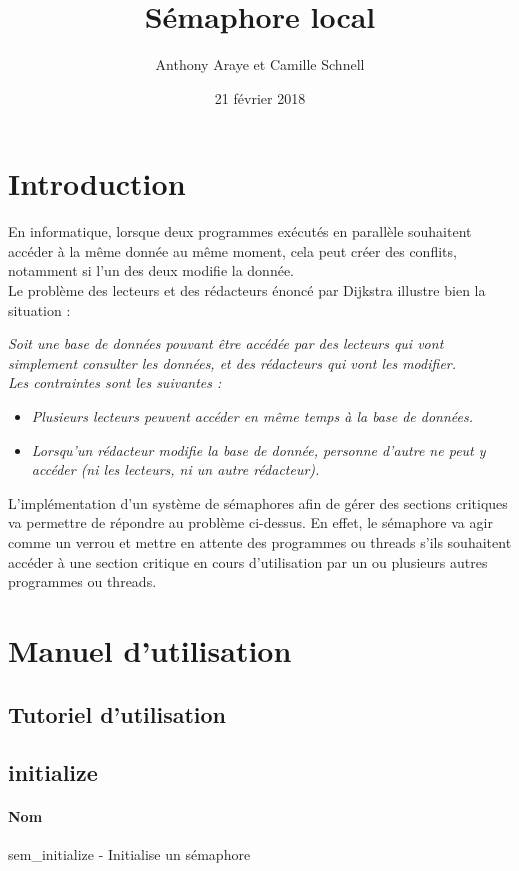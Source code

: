 \documentclass[12pt]{article}
\title{Sémaphore local}
\author{Anthony Araye et Camille Schnell}
\date{21 février 2018}
\begin{document}
\maketitle
\renewcommand{\contentsname}{Sommaire}
\tableofcontents
\newpage
\section{Introduction}
    En informatique, lorsque deux programmes exécutés en parallèle souhaitent accéder à la même donnée au même moment, cela peut créer des conflits, notamment si l'un des deux modifie la donnée. \\

    Le problème des lecteurs et des rédacteurs énoncé par Dijkstra illustre bien la situation :

    \textit{Soit une base de données pouvant être accédée par des lecteurs qui vont simplement consulter les données, et des rédacteurs qui vont les modifier. \\
    Les contraintes sont les suivantes :}
    \begin{itemize}
      \item \textit{Plusieurs lecteurs peuvent accéder en même temps à la base de données.}
      \item \textit{Lorsqu'un rédacteur modifie la base de donnée, personne d'autre ne peut y accéder (ni les lecteurs, ni un autre rédacteur).} \\
    \end{itemize}

    L'implémentation d'un système de sémaphores afin de gérer des sections critiques va permettre de répondre au problème ci-dessus. En effet, le sémaphore va agir comme un verrou et mettre en attente des programmes ou threads s'ils souhaitent accéder à une section critique en cours d'utilisation par un ou plusieurs autres programmes ou threads.


\newpage
\section{Manuel d'utilisation}
    \subsection{Tutoriel d'utilisation}
    \newpage
    \subsection{initialize}
        \paragraph{Nom\\}
        sem\_initialize - Initialise un sémaphore
\end{document}
